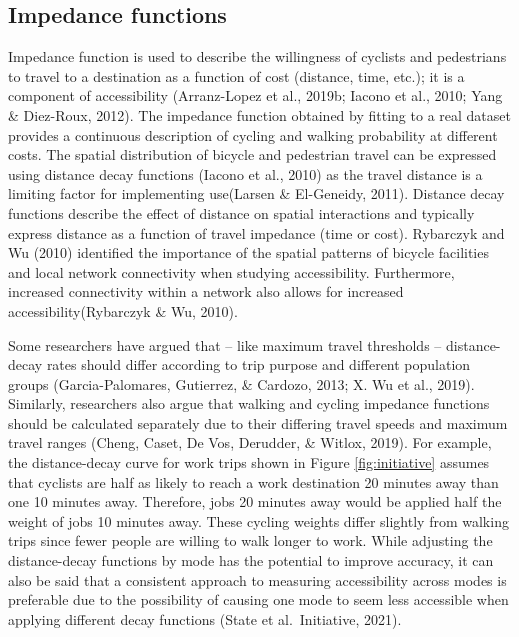 \documentclass[
11pt, %
oneside, %
english, %
singlespacing, %
]{macthesis} %
\begin{document}
\hypertarget{impedance-functions}{%
\subsection{Impedance functions}\label{impedance-functions}}

Impedance function is used to describe the willingness of cyclists and pedestrians to travel to a destination as a function of cost (distance, time, etc.); it is a component of accessibility (Arranz-Lopez et al., 2019b; Iacono et al., 2010; Yang \& Diez-Roux, 2012). The impedance function obtained by fitting to a real dataset provides a continuous description of cycling and walking probability at different costs. The spatial distribution of bicycle and pedestrian travel can be expressed using distance decay functions (Iacono et al., 2010) as the travel distance is a limiting factor for implementing use(Larsen \& El-Geneidy, 2011). Distance decay functions describe the effect of distance on spatial interactions and typically express distance as a function of travel impedance (time or cost). Rybarczyk and Wu (2010) identified the importance of the spatial patterns of bicycle facilities and local network connectivity when studying accessibility. Furthermore, increased connectivity within a network also allows for increased accessibility(Rybarczyk \& Wu, 2010).

Some researchers have argued that -- like maximum travel thresholds -- distance-decay rates should differ according to trip purpose and different population groups (Garcia-Palomares, Gutierrez, \& Cardozo, 2013; X. Wu et al., 2019). Similarly, researchers also argue that walking and cycling impedance functions should be calculated separately due to their differing travel speeds and maximum travel ranges (Cheng, Caset, De Vos, Derudder, \& Witlox, 2019). For example, the distance-decay curve for work trips shown in Figure \ref{fig:initiative} assumes that cyclists are half as likely to reach a work destination 20 minutes away than one 10 minutes away. Therefore, jobs 20 minutes away would be applied half the weight of jobs 10 minutes away. These cycling weights differ slightly from walking trips since fewer people are willing to walk longer to work. While adjusting the distance-decay functions by mode has the potential to improve accuracy, it can also be said that a consistent approach to measuring accessibility across modes is preferable due to the possibility of causing one mode to seem less accessible when applying different decay functions (State et al.~Initiative, 2021).
\end{document}
